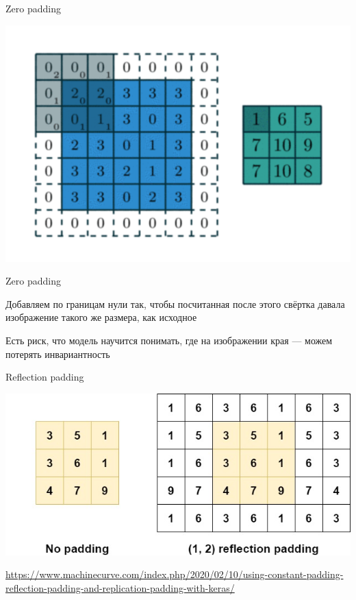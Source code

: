 \documentclass[notes,12pt, aspectratio=169]{beamer}
\newenvironment{wideitemize}{\itemize\addtolength{\itemsep}{10pt}}{\enditemize}
\begin{document}
\begin{frame}{Zero padding}
\begin{center}
	\includegraphics[width=.5\linewidth]{padding.png}
\end{center}
\end{frame}


\begin{frame}{Zero padding}
\begin{wideitemize}
	\item Добавляем по границам нули так, чтобы посчитанная после этого свёртка давала изображение такого же размера, как исходное
	\item Есть риск, что модель научится понимать, где на изображении края — можем потерять инвариантность
\end{wideitemize}
\end{frame}


\begin{frame}{Reflection padding}
\begin{center}
	\includegraphics[width=.8\linewidth]{reflection_pad.jpg}
\end{center}

\vfill %
\footnotesize
{\color{blue} \url{https://www.machinecurve.com/index.php/2020/02/10/using-constant-padding-reflection-padding-and-replication-padding-with-keras/}}
\end{frame}
\end{document}
